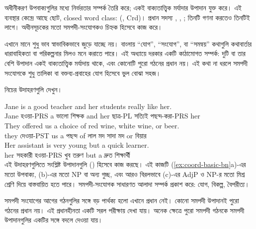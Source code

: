 অধীনীকরণ উপবাক্যগুলির মধ্যে নির্ভরতার সম্পর্ক তৈরি করে;  একই বাক্যতাত্ত্বিক মর্যাদার উপাদান যুক্ত করে। এই ব্যবস্থার কেন্দ্রে আছে ছোট, closed word class:  (, Crd)। প্রধান সদস্য , , ; তিনটি গণনা করতেও তিনটিই লাগে। অধীনসূচকের মতো সমপদী-সংযোগকও চিহ্নক হিসেবে কাজ করে।

এখানে  মানে শুধু ভাব স্বাভাবিকভাবে জুড়ে যাচ্ছে নয়। বাংলায় \enquote{যোগ}, \enquote{সংযোগ}, বা \enquote{সমন্বয়} কথাগুলি কথাবার্তার ধারাবাহিকতা বা পরিকল্পনার মিলও মনে করাতে পারে। এই অধ্যায়ে দরকার একটি কাঠামোগত সম্পর্ক: দুটি বা তার বেশি উপাদান একই বাক্যতাত্ত্বিক মর্যাদায় থাকে, এবং কোনোটি পুরো গঠনের প্রধান নয়। এই কথা না ধরলে সমপদী সংযোগকে শুধু তালিকা বা বক্তব্য-প্রবাহের যোগ হিসেবে ভুল বোঝা সহজ।

নিচের উদাহরণগুলি দেখুন।

\ea \label{ex:coord-basic-bn}
    \ea \gll {\ob}Jane is a good teacher{\cb} {\ob}and her students really like her{\cb}.\\
        Jane হওয়া-PRS a ভালো শিক্ষক and her ছাত্র-PL সত্যিই পছন্দ-করা-PRS her\\
    \glt {}
    \ex \gll They offered us a choice of {\ob}red wine{\cb}, {\ob}white wine{\cb}, {\ob}or beer{\cb}.\\
        they দেওয়া-PST us a পছন্দ of লাল মদ সাদা মদ or বিয়ার\\
    \glt {}
    \ex \gll Her assistant is {\ob}very young{\cb} {\ob}but a quick learner{\cb}.\\
        her সহকারী হওয়া-PRS খুব তরুণ but a দ্রুত শিক্ষার্থী\\
    \glt {}
    \z
\z
এই উদাহরণগুলিতে সংশ্লিষ্ট উপাদানগুলি  () হিসেবে কাজ করছে। এই কাজটি (\ref{ex:coord-basic-bn}a)-এর মতো উপবাক্য, (b)-এর মতো NP বা অন্য গুচ্ছ, এবং আরও বিরলভাবে (c)-এর AdjP ও NP-র মতো মিশ্র শ্রেণি দিয়ে বাস্তবায়িত হতে পারে। সমপদী-সংযোগক সাধারণত আলাদা সম্পর্ক প্রকাশ করে:  যোগ,  বিকল্প,  বৈপরীত্য।

সমপদী সংযোগের আগের গঠনগুলির সঙ্গে বড় পার্থক্য হলো এখানে প্রধান নেই। কোনো সমপদী উপাদানই পুরো গঠনের প্রধান নয়। এই প্রধানহীনতা একটি সরল পরীক্ষায় দেখা যায়। অনেক ক্ষেত্রে পুরো সমপদী গঠনকে সমপদী উপাদানগুলির একটির সঙ্গে বদলে দেওয়া যায়।

